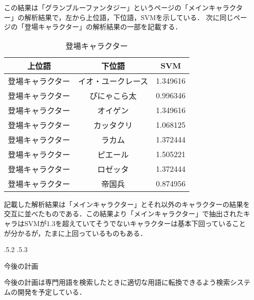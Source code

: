 \documentclass[uplatex]{jsarticle}
\makeatletter
\renewcommand{\section}{%
    \if@slide\clearpage\fi
    \@startsection{section}{1}{\z@}%
    {\Cvs \@plus.5\Cdp \@minus.2\Cdp}%
    {.5\Cvs \@plus.3\Cdp}%
    {\normalfont\raggedright}}
\makeatother
\begin{document}
この結果は「グランブルーファンタジー」というページの「メインキャラクター」の解析結果で，左から上位語，下位語，SVMを示している．
次に同じページの「登場キャラクター」の解析結果の一部を記載する．

\begin{table}[htb]
  \begin{center}
    \caption{登場キャラクター}
    \begin{tabular}{|c|c||c|} \hline
     上位語 & 下位語 & SVM \\ \hline \hline
{登場キャラクター} & イオ・ユークレース & 1.349616\\
{登場キャラクター} & ぴにゃこら太 & 0.996346\\
{登場キャラクター} &オイゲン & 1.349616\\
{登場キャラクター} & カッタクリ & 1.068125\\
{登場キャラクター} & ラカム & 1.372444\\
{登場キャラクター} & ピエール &1.505221\\
{登場キャラクター} & ロゼッタ & 1.372444\\
{登場キャラクター} & 帝国兵& 0.874956\\\hline
 \end{tabular}
  \end{center}
\end{table}
記載した解析結果は「メインキャラクター」とそれ以外のキャラクターの結果を交互に並べたものである．この結果より「メインキャラクター」で抽出されたキャラはSVMが1.3を超えていてそうでないキャラクターは基本下回っていることが分かるが，たまに上回っているものもある．



\section{今後の計画}


今後の計画は専門用語を検索したときに適切な用語に転換できるよう検索システムの開発を予定している．



\end{document}
